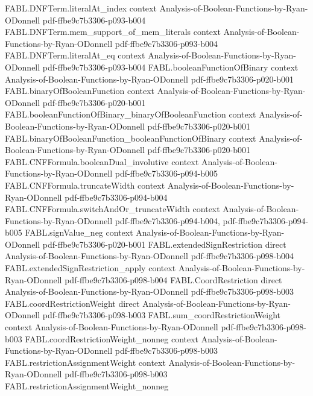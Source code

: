 \begin{theorem}
  {FABL.DNFTerm.literalAt_index}
  {context}
  {Analysis-of-Boolean-Functions-by-Ryan-ODonnell}
  {pdf-ffbe9c7b3306-p093-b004}
\proofstep
  {FABL.DNFTerm.mem_support_of_mem_literals}
  {context}
  {Analysis-of-Boolean-Functions-by-Ryan-ODonnell}
  {pdf-ffbe9c7b3306-p093-b004}
\proofstep
  {FABL.DNFTerm.literalAt_eq}
  {context}
  {Analysis-of-Boolean-Functions-by-Ryan-ODonnell}
  {pdf-ffbe9c7b3306-p093-b004}
\proofstep
  {FABL.booleanFunctionOfBinary}
  {context}
  {Analysis-of-Boolean-Functions-by-Ryan-ODonnell}
  {pdf-ffbe9c7b3306-p020-b001}
\proofstep
  {FABL.binaryOfBooleanFunction}
  {context}
  {Analysis-of-Boolean-Functions-by-Ryan-ODonnell}
  {pdf-ffbe9c7b3306-p020-b001}
\proofstep
  {FABL.booleanFunctionOfBinary_binaryOfBooleanFunction}
  {context}
  {Analysis-of-Boolean-Functions-by-Ryan-ODonnell}
  {pdf-ffbe9c7b3306-p020-b001}
\proofstep
  {FABL.binaryOfBooleanFunction_booleanFunctionOfBinary}
  {context}
  {Analysis-of-Boolean-Functions-by-Ryan-ODonnell}
  {pdf-ffbe9c7b3306-p020-b001}
\proofstep
  {FABL.CNFFormula.booleanDual_involutive}
  {context}
  {Analysis-of-Boolean-Functions-by-Ryan-ODonnell}
  {pdf-ffbe9c7b3306-p094-b005}
\proofstep
  {FABL.CNFFormula.truncateWidth}
  {context}
  {Analysis-of-Boolean-Functions-by-Ryan-ODonnell}
  {pdf-ffbe9c7b3306-p094-b004}
\proofstep
  {FABL.CNFFormula.switchAndOr_truncateWidth}
  {context}
  {Analysis-of-Boolean-Functions-by-Ryan-ODonnell}
  {pdf-ffbe9c7b3306-p094-b004,
    pdf-ffbe9c7b3306-p094-b005}
\proofstep
  {FABL.signValue_neg}
  {context}
  {Analysis-of-Boolean-Functions-by-Ryan-ODonnell}
  {pdf-ffbe9c7b3306-p020-b001}
\proofstep
  {FABL.extendedSignRestriction}
  {direct}
  {Analysis-of-Boolean-Functions-by-Ryan-ODonnell}
  {pdf-ffbe9c7b3306-p098-b004}
\proofstep
  {FABL.extendedSignRestriction_apply}
  {context}
  {Analysis-of-Boolean-Functions-by-Ryan-ODonnell}
  {pdf-ffbe9c7b3306-p098-b004}
\proofstep
  {FABL.CoordRestriction}
  {direct}
  {Analysis-of-Boolean-Functions-by-Ryan-ODonnell}
  {pdf-ffbe9c7b3306-p098-b003}
\proofstep
  {FABL.coordRestrictionWeight}
  {direct}
  {Analysis-of-Boolean-Functions-by-Ryan-ODonnell}
  {pdf-ffbe9c7b3306-p098-b003}
\proofstep
  {FABL.sum_coordRestrictionWeight}
  {context}
  {Analysis-of-Boolean-Functions-by-Ryan-ODonnell}
  {pdf-ffbe9c7b3306-p098-b003}
\proofstep
  {FABL.coordRestrictionWeight_nonneg}
  {context}
  {Analysis-of-Boolean-Functions-by-Ryan-ODonnell}
  {pdf-ffbe9c7b3306-p098-b003}
\proofstep
  {FABL.restrictionAssignmentWeight}
  {context}
  {Analysis-of-Boolean-Functions-by-Ryan-ODonnell}
  {pdf-ffbe9c7b3306-p098-b003}
\proofstep
  {FABL.restrictionAssignmentWeight_nonneg}

\end{theorem}

